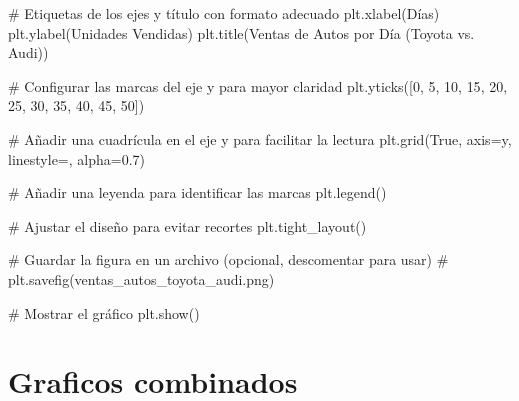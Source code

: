 \documentclass[
  jou,
  floatsintext,
  longtable,
  a4paper,
  nolmodern,
  notxfonts,
  notimes,
  colorlinks=true,linkcolor=blue,citecolor=blue,urlcolor=blue]{apa7}
\newenvironment{Shaded}{\begin{snugshade}}{\end{snugshade}}
\newcommand{\CommentTok}[1]{\textcolor[rgb]{0.37,0.37,0.37}{#1}}
\newcommand{\DecValTok}[1]{\textcolor[rgb]{0.68,0.00,0.00}{#1}}
\newcommand{\FloatTok}[1]{\textcolor[rgb]{0.68,0.00,0.00}{#1}}
\newcommand{\NormalTok}[1]{\textcolor[rgb]{0.00,0.23,0.31}{#1}}
\newcommand{\OperatorTok}[1]{\textcolor[rgb]{0.37,0.37,0.37}{#1}}
\newcommand{\StringTok}[1]{\textcolor[rgb]{0.13,0.47,0.30}{#1}}
\newcommand{\VariableTok}[1]{\textcolor[rgb]{0.07,0.07,0.07}{#1}}
\begin{document}
\begin{Shaded}
\begin{Highlighting}[]
\CommentTok{\# Etiquetas de los ejes y título con formato adecuado}
\NormalTok{plt.xlabel(}\StringTok{\textquotesingle{}Días\textquotesingle{}}\NormalTok{)}
\NormalTok{plt.ylabel(}\StringTok{\textquotesingle{}Unidades Vendidas\textquotesingle{}}\NormalTok{)}
\NormalTok{plt.title(}\StringTok{\textquotesingle{}Ventas de Autos por Día (Toyota vs. Audi)\textquotesingle{}}\NormalTok{)}

\CommentTok{\# Configurar las marcas del eje y para mayor claridad}
\NormalTok{plt.yticks([}\DecValTok{0}\NormalTok{, }\DecValTok{5}\NormalTok{, }\DecValTok{10}\NormalTok{, }\DecValTok{15}\NormalTok{, }\DecValTok{20}\NormalTok{, }\DecValTok{25}\NormalTok{, }\DecValTok{30}\NormalTok{, }\DecValTok{35}\NormalTok{, }\DecValTok{40}\NormalTok{, }\DecValTok{45}\NormalTok{, }\DecValTok{50}\NormalTok{])}

\CommentTok{\# Añadir una cuadrícula en el eje y para facilitar la lectura}
\NormalTok{plt.grid(}\VariableTok{True}\NormalTok{, axis}\OperatorTok{=}\StringTok{\textquotesingle{}y\textquotesingle{}}\NormalTok{, linestyle}\OperatorTok{=}\StringTok{\textquotesingle{}{-}{-}\textquotesingle{}}\NormalTok{, alpha}\OperatorTok{=}\FloatTok{0.7}\NormalTok{)}

\CommentTok{\# Añadir una leyenda para identificar las marcas}
\NormalTok{plt.legend()}

\CommentTok{\# Ajustar el diseño para evitar recortes}
\NormalTok{plt.tight\_layout()}

\CommentTok{\# Guardar la figura en un archivo (opcional, descomentar para usar)}
\CommentTok{\# plt.savefig(\textquotesingle{}ventas\_autos\_toyota\_audi.png\textquotesingle{})}

\CommentTok{\# Mostrar el gráfico}
\NormalTok{plt.show()}
\end{Highlighting}
\end{Shaded}

\section{Graficos combinados}\label{graficos-combinados}
\end{document}
